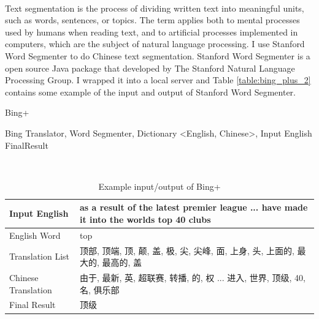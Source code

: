 \\
Text segmentation is the process of dividing written text into meaningful units, such as words, sentences, or topics. The term applies both to mental processes used by humans when reading text, and to artificial processes implemented in computers, which are the subject of natural language processing. I use Stanford Word Segmenter to do Chinese text segmentation. Stanford Word Segmenter is a open source Java package that developed by The Stanford Natural Language Processing Group. I wrapped it into a local server and Table \ref{table:bing_plus_2} contains some example of the input and output of Stanford Word Segmenter.
\\
\begin{algorithm}[ht]
\caption{Bing+}
\label{algorithm:wsd_4}
\begin{algorithmic}
\REQUIRE Bing Translator, Word Segmenter, Dictionary \textless English, Chinese\textgreater, Input English
        \ENDIF
    \ENDFOR
        \ENDIF
    \ENDFOR
\ENDIF
\RETURN FinalResult
\end{algorithmic}
\end{algorithm}
\\
\begin{table}[ht]
    \caption{Example input/output of Bing+}
    \begin{center}
    \begin{tabular}{| p{2.5cm} | p{4cm} |}
        \hline
        Input English & as a result of the latest premier league ... have made it into the worlds top 40 clubs\\
        \hline
        English Word & top \\
        \hline
        Translation List & \parbox[t]{4cm}{顶部, 顶端, 顶, 颠, 盖, 极, 尖, 尖峰, 面, 上身, 头, 上面的, 最大的, 最高的, 盖}\\
        \hline
        Chinese Translation & 由于, 最新, 英, 超联赛, 转播, 的, 权 ... 进入, 世界, 顶级, 40, 名, 俱乐部\\
        \hline
        Final Result & 顶级\\
        \hline
    \end{tabular}
    \end{center}
\end{table}

